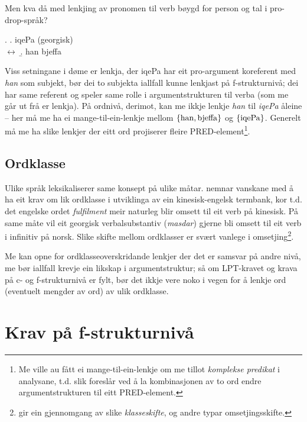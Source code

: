 \documentclass[11pt,a4paper,oneside,draft]{book}
\begin{document}
Men kva då med lenkjing av pronomen til verb bøygd for person og tal i
pro-drop-språk?

\ex. \a. iqePa                                  \hfill{} (georgisk) \\
     $\leftrightarrow$
     \b. han bjeffa

Viss setningane i døme \Last er lenkja, der iqePa har eit pro-argument
koreferent med \emph{han} som subjekt, bør dei to subjekta iallfall kunne
lenkjast på f-strukturnivå; dei har same referent og speler same rolle
i argumentstrukturen til verba (som me går ut frå er lenkja). På
ordnivå, derimot, kan me ikkje lenkje \emph{han} til \emph{iqePa} åleine -- her
må me ha ei mange-til-ein-lenkje mellom $\{ \rm han, bjeffa \}$ og $\{
\rm iqePa \}$. 
Generelt må me ha slike lenkjer der eitt ord projiserer fleire
PRED-element\footnote{Me ville au fått ei mange-til-ein-lenkje om me tillot
        \emph{komplekse predikat} i analysane, t.d. slik
        \citet{butt1998merger} foreslår ved å la kombinasjonen av to
        ord endre argumentstrukturen til eitt PRED-element. }.

\subsection{Ordklasse}
\label{sec-3.5.1}

Ulike språk leksikaliserer same konsept på ulike
måtar. \citet[s.~3]{cheung2002scg} nemnar vanskane med å ha eit krav
om lik ordklasse i utviklinga av ein kinesisk-engelsk termbank, kor
t.d. det engelske ordet \emph{fulfilment} meir naturleg blir omsett til eit
verb på kinesisk. På same måte vil eit georgisk verbalsubstantiv
(\emph{masdar}) gjerne bli omsett til eit verb i infinitiv på
norsk. Slike skifte mellom ordklasser er svært vanlege i
omsetjing\footnote{\citet[Catford~(1965),~i][s.~61]{munday2001its} gir ein gjennomgang av
       slike \emph{klasseskifte}, og andre typar omsetjingsskifte. }.

Me kan opne for ordklasseoverskridande lenkjer der det er samsvar på
andre nivå, me bør iallfall krevje ein likskap i argumentstruktur; så
om LPT-kravet og krava på c- og f-strukturnivå er fylt, bør det ikkje
vere noko i vegen for å lenkje ord (eventuelt mengder av ord) av ulik
ordklasse.


\section{Krav på f-strukturnivå}
\label{sec-3.6}
\end{document}
